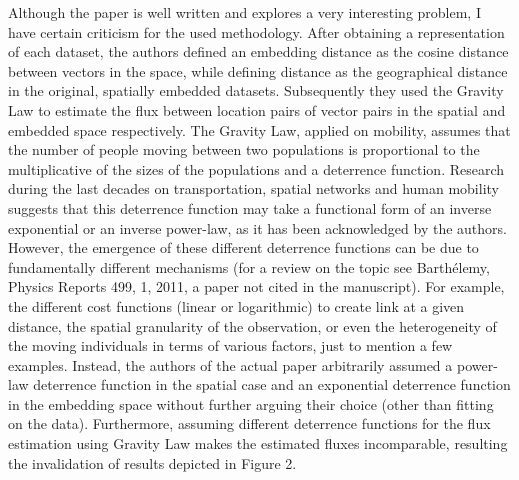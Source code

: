 \documentclass[12pt,a4paper]{article}
\newcommand{\rcomment}[1]{%
\vspace{10pt}
\begin{tcolorbox}[colback=black!3,colframe=white!45!black, left=0pt, right=0pt, top=0pt, bottom=0pt, arc=0pt,outer arc=0pt, grow to left by=-0.5cm,grow to right by=-0.5cm]
#1
\end{tcolorbox}
}
\begin{document}
\rcomment{%
Although the paper is well written and explores a very interesting problem, I have certain criticism for the used methodology. After obtaining a representation of each dataset, the authors defined an embedding distance as the cosine distance between vectors in the space, while defining distance as the geographical distance in the original, spatially embedded datasets. Subsequently they used the Gravity Law to estimate the flux between location pairs of vector pairs in the spatial and embedded space respectively. The Gravity Law, applied on mobility, assumes that the number of people moving between two populations is proportional to the multiplicative of the sizes of the populations and a deterrence function. Research during the last decades on transportation, spatial networks and human mobility suggests that this deterrence function may take a functional form of an inverse exponential or an inverse power-law, as it has been acknowledged by the authors. However, the emergence of these different deterrence functions can be due to fundamentally different mechanisms (for a review on the topic see Barthélemy, Physics Reports 499, 1, 2011, a paper not cited in the manuscript). For example, the different cost functions (linear or logarithmic) to create link at a given distance, the spatial granularity of the observation, or even the heterogeneity of the moving individuals in terms of various factors, just to mention a few examples. Instead, the authors of the actual paper arbitrarily assumed a power-law deterrence function in the spatial case and an exponential deterrence function in the embedding space without further arguing their choice (other than fitting on the data). Furthermore, assuming different deterrence functions for the flux estimation using Gravity Law makes the estimated fluxes incomparable, resulting the invalidation of results depicted in Figure 2.
}
\end{document}
